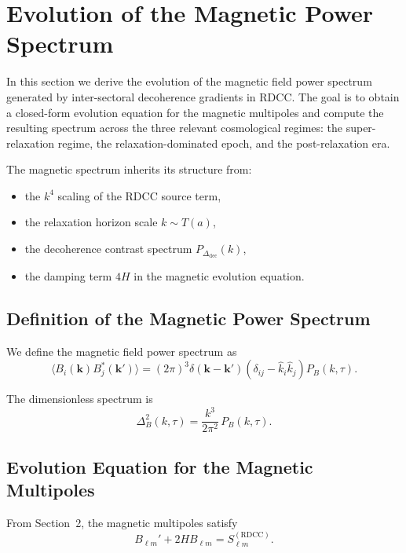 \documentclass[11pt,a4paper]{article}
\begin{document}
\section{Evolution of the Magnetic Power Spectrum}

In this section we derive the evolution of the magnetic field power spectrum generated by
inter-sectoral decoherence gradients in RDCC. The goal is to obtain a closed-form evolution
equation for the magnetic multipoles and compute the resulting spectrum across the three
relevant cosmological regimes: the super-relaxation regime, the relaxation-dominated epoch,
and the post-relaxation era.

The magnetic spectrum inherits its structure from:
\begin{itemize}
\item the $k^{4}$ scaling of the RDCC source term,
\item the relaxation horizon scale $k \sim T(a)$,
\item the decoherence contrast spectrum $P_{\Delta_{\mathrm{dec}}}(k)$,
\item the damping term $4H$ in the magnetic evolution equation.
\end{itemize}

\subsection{Definition of the Magnetic Power Spectrum}

We define the magnetic field power spectrum as
\begin{equation}
\langle B_{i}(\mathbf{k}) B_{j}^{*}(\mathbf{k}') \rangle
=
(2\pi)^{3}
\delta(\mathbf{k}-\mathbf{k}')
\left(
\delta_{ij}
-
\hat{k}_{i}\hat{k}_{j}
\right)
P_{B}(k,\tau).
\end{equation}

The dimensionless spectrum is
\begin{equation}
\Delta_{B}^{2}(k,\tau)
=
\frac{k^{3}}{2\pi^{2}}\,P_{B}(k,\tau).
\end{equation}

\subsection{Evolution Equation for the Magnetic Multipoles}

From Section~2, the magnetic multipoles satisfy
\begin{equation}
B_{\ell m}' + 2H B_{\ell m}
=
S_{\ell m}^{(\mathrm{RDCC})}.
\end{equation}
\end{document}
